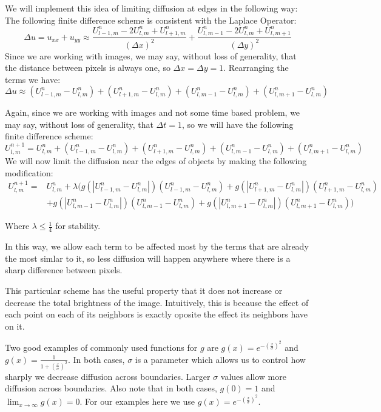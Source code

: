 We will implement this idea of limiting diffusion at edges in the following way:
The following finite difference scheme is consistent with the Laplace Operator:
\[\Delta u = u_{xx}+u_{yy} \approx \frac{U_{l-1,m}^n - 2 U_{l,m}^n + U_{l+1,m}^n}{(\Delta x)^2} + \frac{U_{l,m-1}^n-2 U_{l,m}^n + U_{l,m+1}^n}{(\Delta y)^2}\]
Since we are working with images, we may say, without loss of generality, that the distance between pixels is always one, so $\Delta x = \Delta y = 1$. Rearranging the terms we have:
\[\Delta u \approx (U_{l-1,m}^n - U_{l,m}^n) + (U_{l+1,m}^n - U_{l,m}^n) + (U_{l,m-1}^n - U_{l,m}^n) + (U_{l,m+1}^n - U_{l,m}^n)\]

Again, since we are working with images and not some time based problem, we may say, without loss of generality, that $\Delta t = 1$, so we will have the following finite difference scheme:
\[U_{l,m}^{n+1} = U_{l,m}^n + (U_{l-1,m}^n - U_{l,m}^n) + (U_{l+1,m}^n - U_{l,m}^n) + (U_{l,m-1}^n - U_{l,m}^n) + (U_{l,m+1}^n - U_{l,m}^n)\]
We will now limit the diffusion near the edges of objects by making the following modification:
\begin{equation*}
\begin{split}
U_{l,m}^{n+1} =& U_{l,m}^n + \lambda (g(|U_{l-1,m}^n - U_{l,m}^n|)(U_{l-1,m}^n - U_{l,m}^n) + g(|U_{l+1,m}^n - U_{l,m}^n|)(U_{l+1,m}^n - U_{l,m}^n) \\
 &+ g(|U_{l,m-1}^n - U_{l,m}^n|)(U_{l,m-1}^n - U_{l,m}^n) + g(|U_{l,m+1}^n - U_{l,m}^n|)(U_{l,m+1}^n - U_{l,m}^n))
\end{split}
\end{equation*}

Where $\lambda \leq \frac{1}{4}$ for stability.

In this way, we allow each term to be affected most by the terms that are already the most simlar to it, so less diffusion will happen anywhere where there is a sharp difference between pixels.

This particular scheme has the useful property that it does not increase or decrease the total brightness of the image.
Intuitively, this is because the effect of each point on each of its neighbors is exactly oposite the effect its neighbors have on it.

Two good examples of commonly used functions for $g$ are $g(x) = e^{-\left(\frac{x}{\sigma}\right)^2}$ and $g(x) = \frac{1}{1+\left(\frac{x}{\sigma}\right)^2}$. 
In both cases, $\sigma$ is a parameter which allows us to control how sharply we decrease diffusion across boundaries.
Larger $\sigma$ values allow more diffusion across boundaries.
Also note that in both cases, $g(0) = 1$ and $\displaystyle{\lim_{x\to \infty} g(x) = 0}$.
For our examples here we use $g(x)=e^{-\left(\frac{x}{\sigma}\right)^2}$.

